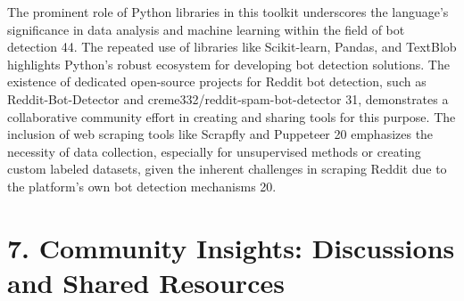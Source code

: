 \documentclass[
  12pt,
  letterpaper,
  DIV=11,
  numbers=noendperiod]{scrartcl}
\begin{document}
The prominent role of Python libraries in this toolkit underscores the
language's significance in data analysis and machine learning within the
field of bot detection 44. The repeated use of libraries like
Scikit-learn, Pandas, and TextBlob highlights Python's robust ecosystem
for developing bot detection solutions. The existence of dedicated
open-source projects for Reddit bot detection, such as
Reddit-Bot-Detector and creme332/reddit-spam-bot-detector 31,
demonstrates a collaborative community effort in creating and sharing
tools for this purpose. The inclusion of web scraping tools like
Scrapfly and Puppeteer 20 emphasizes the necessity of data collection,
especially for unsupervised methods or creating custom labeled datasets,
given the inherent challenges in scraping Reddit due to the platform's
own bot detection mechanisms 20.

\section{\texorpdfstring{\textbf{7. Community Insights: Discussions and
Shared
Resources}}{7. Community Insights: Discussions and Shared Resources}}\label{community-insights-discussions-and-shared-resources}
\end{document}
